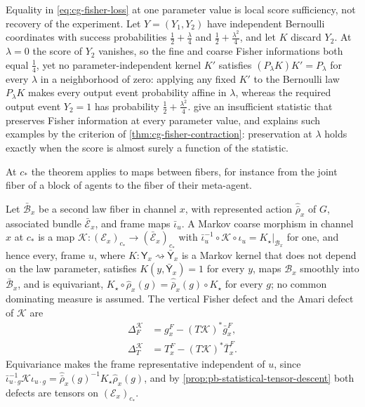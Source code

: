 Equality in \eqref{eq:cg-fisher-loss} at one parameter value is local score
sufficiency, not recovery of the experiment.  Let $Y=(Y_1,Y_2)$ have independent
Bernoulli coordinates with success probabilities $\tfrac12+\tfrac\lambda4$ and
$\tfrac12+\tfrac{\lambda^2}4$, and let $K$ discard $Y_2$.  At $\lambda=0$ the score of
$Y_2$ vanishes, so the fine and coarse Fisher informations both equal $\tfrac14$, yet no
parameter-independent kernel $K'$ satisfies $(P_\lambda K)K'=P_\lambda$ for every
$\lambda$ in a neighborhood of zero: applying any fixed $K'$ to the
Bernoulli law $P_\lambda K$ makes every output event probability affine in
$\lambda$, whereas the required output event $Y_2=1$ has probability
$\tfrac12+\tfrac{\lambda^2}4$.  \citet{KaganShepp2005} give an insufficient statistic that
preserves Fisher information at every parameter value, and
\citet[Theorem~7]{Pollard2013} explains such examples by the criterion of
\cref{thm:cg-fisher-contraction}: preservation at $\lambda$ holds exactly when the score
is almost surely a function of the statistic.  

At $c_*$ the theorem applies to maps between fibers, for instance from the joint fiber
of a block of agents to the fiber of their meta-agent.

Let $\bar{\mathcal B}_x$ be a second law fiber in channel $x$, with represented action
$\widehat{\bar\rho}_x$ of $G$, associated bundle $\bar{\mathcal E}_x$, and frame maps
$\bar\iota_u$.  A Markov coarse morphism in channel $x$ at $c_*$ is a map
$\mathscr K:(\mathcal E_x)_{c_*}\to(\bar{\mathcal E}_x)_{c_*}$ with
$\bar\iota_u^{-1}\circ\mathscr K\circ\iota_u=K_\star|_{\mathcal B_x}$ for one, and hence
every, frame $u$, where $K:\mathsf Y_x\rightsquigarrow\bar{\mathsf Y}_x$ is a Markov
kernel that does not depend on the law parameter, satisfies $K(y,\bar{\mathsf Y}_x)=1$
for every $y$, maps $\mathcal B_x$ smoothly into $\bar{\mathcal B}_x$, and is
equivariant, $K_\star\circ\widehat\rho_x(g)=\widehat{\bar\rho}_x(g)\circ K_\star$ for
every $g$; no common dominating measure is assumed.  The vertical Fisher defect and the
Amari defect of $\mathscr K$ are
\begin{align}
\Delta_F^{\mathscr K}
&=g^F_x-(T\mathscr K)^*\bar g^F_x,
\label{eq:pb-vertical-fisher-defect}\\
\Delta_T^{\mathscr K}
&=T^F_x-(T\mathscr K)^*\bar T^F_x.
\label{eq:pb-amari-defect}
\end{align}
Equivariance makes the frame representative independent of $u$, since
$\bar\iota_{u\cdot g}^{-1}\mathscr K\iota_{u\cdot g}
=\widehat{\bar\rho}_x(g)^{-1}K_\star\widehat\rho_x(g)$, and by
\cref{prop:pb-statistical-tensor-descent} both defects are tensors on
$(\mathcal E_x)_{c_*}$.

